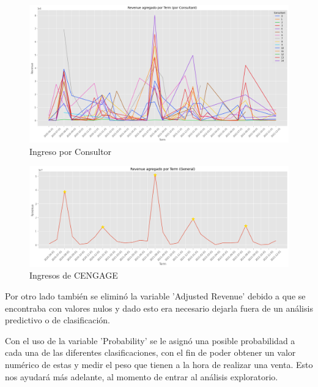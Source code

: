 \documentclass{article}
\begin{document}
        \newpage
        \begin{figure}[h]
            \centering
            \includegraphics[width=\columnwidth]{img/revenue_consultant_time_series.png}
            \caption{Ingreso por Consultor}
            \label{fig:revenueCons}
        \end{figure}


        \begin{figure}[h]
            \centering
            \includegraphics[width = \columnwidth]{img/revenue_time_series.png}
            \caption{Ingresos de CENGAGE}
            \label{fig:revenue}
        \end{figure}

        Por otro lado también se eliminó la variable 'Adjusted Revenue' debido a que se encontraba con valores nulos y dado esto era necesario dejarla fuera de un análisis predictivo o de clasificación.


        
        \vspace{3 mm}
        
        Con el uso de la variable 'Probability' se le asignó una posible probabilidad a cada una de las diferentes clasificaciones, con el fin de poder obtener un valor numérico de estas y medir el peso que tienen a la hora de realizar una venta. Esto nos ayudará más adelante, al momento de entrar al análisis exploratorio.
        
\end{document}
